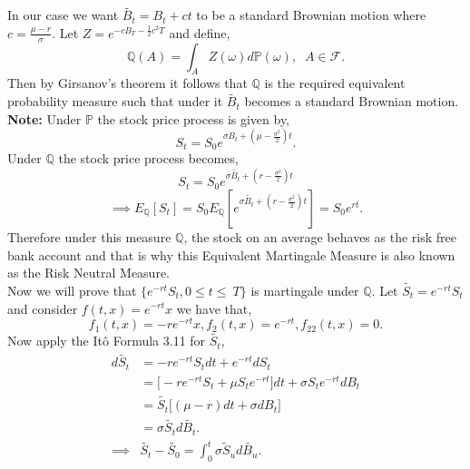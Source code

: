 \documentclass[12pt]{report}
\begin{document}
In our case we want $\widetilde{B_{t}} = B_{t} + ct$ to be a standard Brownian motion where $c = \frac{\mu-r}{\sigma}$. Let $Z = e^{-cB_T - \frac{1}{2}c^2T}$ and define,\\
\begin{equation}
\mathbb{Q}(A) = \int_A Z(\omega) d\mathbb{P}(\omega),\;\;A\in\mathcal{F}.
\end{equation}
Then by Girsanov's theorem it follows that $\mathbb{Q}$ is the required equivalent probability measure such that under it $\widetilde{B_{t}}$ becomes a standard Brownian motion.\\
\textbf{Note:} Under $\mathbb{P}$ the stock price process is given by,\\
\begin{equation}
    S_t=S_{0}e^{\sigma B_{t}+(\mu-\frac{\sigma^{2}}{2})t}.
\end{equation}
Under $\mathbb{Q}$ the stock price process becomes,\\
\begin{equation}
    S_t = S_0 e^{\sigma \widetilde{ B_{t}}+(r-\frac{\sigma^{2}}{2})t}
\end{equation}
$$\implies E_{\mathbb{Q}}[S_t] = S_0 E_{\mathbb{Q}}[e^{\sigma \widetilde{ B_{t}}+(r-\frac{\sigma^{2}}{2})t}] = S_0 e^{rt}.$$
Therefore under this measure $\mathbb{Q}$, the stock on an average behaves as the risk free bank account and that is why this Equivalent Martingale Measure is also known as the Risk Neutral Measure.\\
Now we will prove that $\{e^{-rt}S_t ,0 \leq t \leq\ T\}$ is martingale under $\mathbb{Q}$. Let  $\widetilde{S_t} = e^{-rt}S_{t}$ and consider $f(t,x) = e^{-rt} x$ we have that,\\
$$f_{1}(t,x) = -r e^{-rt} x , f_{2}(t,x) = e^{-rt}, f_{22}(t,x) = 0. $$
Now apply the Itô Formula 3.11 for $\widetilde{S_t}$,\\
\begin{align*}
    d\widetilde{S_t}& = -re^{-rt}S_tdt + e^{-rt}dS_{t}\\
    &=\Big[-r e^{-rt} S_t + \mu S_t e^{-rt}\Big]dt + \sigma S_t e^{-rt} dB_t\\
    &=\widetilde{S_t}\Big[(\mu - r) dt + \sigma dB_t\Big]\\
    &=\sigma \widetilde{S_t} d\widetilde{B_t}.\\ 
    \implies& \widetilde{S_t} - \widetilde{S_0} = \int_{0}^{t}\sigma \widetilde{S}_ud\widetilde{B_u}.\\
\end{align*}
\end{document}
